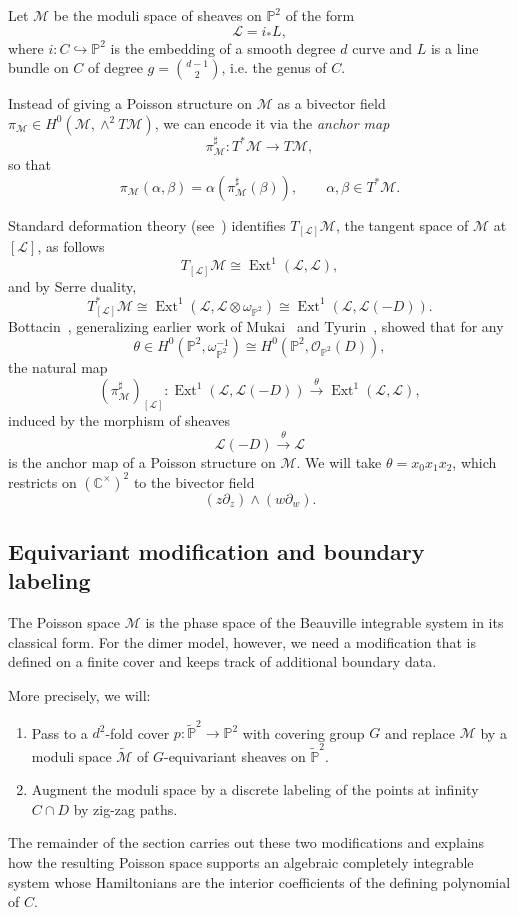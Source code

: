 \documentclass[dvipsnames,11pt]{article}
\theoremstyle{definition}
\newcommand{\cO}{\mathcal{O}}
\newcommand{\C}{{\mathbb C}}
\renewcommand{\P}{{\mathbb P}}
\def\Ext{\operatorname{Ext}}
\def\Ext{\operatorname{Ext}}
\begin{document}
    Let $\mathcal M$ be the moduli space of sheaves on $\P^2$ of the form \[\mathcal L=i_*L,\]
where $i:C\hookrightarrow \P^2$ is the embedding of a smooth degree $d$ curve and $L$ is a line bundle on $C$ of degree $g = \binom{d-1}{2}$, i.e. the genus of $C$. 
 

Instead of giving a Poisson structure on ${\mathcal M}$ as a bivector field $\pi_{\mathcal M}\in H^0( {\mathcal M},\wedge^2 T {\mathcal M})$, we can encode it via the \emph{anchor map}
\[
\pi^\sharp_{\mathcal M}:T^*{\mathcal M} \rightarrow T {\mathcal M},
\]
so that
\[
\pi_{\mathcal M}(\alpha,\beta)=\alpha(\pi_{\mathcal M}^\sharp(\beta)), \qquad \alpha,\beta \in T^* {\mathcal M}.
\]


Standard deformation theory (see~\cite{Hartshorne}) identifies $T_{[\mathcal L]}\mathcal M$, the tangent space of $\mathcal M$ at $[\mathcal L]$, as follows
\[
T_{[\mathcal L]}\mathcal M\cong \Ext^1(\mathcal L,\mathcal L),
\]
and by Serre duality,
\[
T^*_{[\mathcal L]}\mathcal M\cong \Ext^1(\mathcal L,\mathcal L\otimes \omega_{\P^2})
\cong \Ext^1(\mathcal L,\mathcal L(-D)).
\]
Bottacin~\cite{Bottacin}, generalizing earlier work of Mukai~\cite{Mukai} and Tyurin~\cite{Tyurin},
showed that for any \[\theta\in H^0(\P^2,\omega_{\P^2}^{-1})\cong H^0(\P^2,\cO_{\P^2}(D)),\]
the natural map
\[
(\pi_{\mathcal M}^\sharp)_{[\mathcal L]}:\Ext^1(\mathcal L,\mathcal L(-D))
\xrightarrow{\ \theta\ }
\Ext^1(\mathcal L,\mathcal L),
\]
induced by the morphism of sheaves \[\mathcal L(-D)\xrightarrow{\ \theta\ } \mathcal L\]
is the anchor map of a Poisson structure on $\mathcal M$. We will take $\theta=x_0x_1x_2$, which restricts on $(\C^\times)^2$ to the bivector field
\[
(z\partial_z)\wedge(w\partial_w).
\]

\subsection{Equivariant modification and boundary labeling}\label{sec:equiv_bottacin}

The Poisson space $\mathcal M$ is the phase space of the Beauville integrable system in its classical form. For the dimer model, however, we need a modification that is defined on a finite cover and keeps track of additional boundary data.

More precisely, we will:
\begin{enumerate}
\item Pass to a $d^2$-fold cover $p:\widetilde\P^2\to\P^2$ with covering group $G$ and replace $\mathcal M$ by a moduli space $\widetilde{\mathcal M}$ of $G$-equivariant sheaves on $\widetilde\P^2$. 
\item Augment the moduli space by a discrete labeling of the points at infinity
$C\cap D$ by zig-zag paths.
\end{enumerate}
The remainder of the section carries out these two modifications and explains how the resulting Poisson space supports an algebraic completely integrable system whose Hamiltonians are the
interior coefficients of the defining polynomial of $C$.
\end{document}

